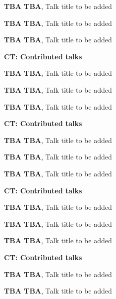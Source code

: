 \documentclass[ILAS2025-program.tex]{subfiles}
\begin{document}
\begin{description}
\begin{description}
    \item[] \textbf{TBA TBA}, Talk title to be added
        \item[] \textbf{TBA TBA}, Talk title to be added
        \item[] \textbf{TBA TBA}, Talk title to be added
        \end{description}
    \begin{description}
    \item[] \textbf{CT: Contributed talks} 
    \item[] \textbf{TBA TBA}, Talk title to be added
        \item[] \textbf{TBA TBA}, Talk title to be added
        \item[] \textbf{TBA TBA}, Talk title to be added
        \end{description}
    \begin{description}
    \item[] \textbf{CT: Contributed talks} 
    \item[] \textbf{TBA TBA}, Talk title to be added
        \item[] \textbf{TBA TBA}, Talk title to be added
        \item[] \textbf{TBA TBA}, Talk title to be added
        \end{description}
    \begin{description}
    \item[] \textbf{CT: Contributed talks} 
    \item[] \textbf{TBA TBA}, Talk title to be added
        \item[] \textbf{TBA TBA}, Talk title to be added
        \item[] \textbf{TBA TBA}, Talk title to be added
        \end{description}
    \begin{description}
    \item[] \textbf{CT: Contributed talks} 
    \item[] \textbf{TBA TBA}, Talk title to be added
        \item[] \textbf{TBA TBA}, Talk title to be added

\end{description}
\end{description}
\end{document}
